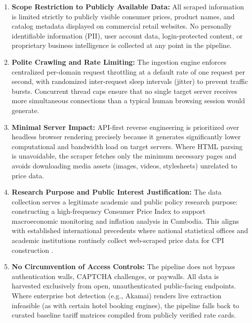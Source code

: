 \begin{enumerate}
    \item \textbf{Scope Restriction to Publicly Available Data:} All scraped information is limited strictly to publicly visible consumer prices, product names, and catalog metadata displayed on commercial retail websites. No personally identifiable information (PII), user account data, login-protected content, or proprietary business intelligence is collected at any point in the pipeline.

    \item \textbf{Polite Crawling and Rate Limiting:} The ingestion engine enforces centralized per-domain request throttling at a default rate of one request per second, with randomized inter-request sleep intervals (jitter) to prevent traffic bursts. Concurrent thread caps ensure that no single target server receives more simultaneous connections than a typical human browsing session would generate.

    \item \textbf{Minimal Server Impact:} API-first reverse engineering is prioritized over headless browser rendering precisely because it generates significantly lower computational and bandwidth load on target servers. Where HTML parsing is unavoidable, the scraper fetches only the minimum necessary pages and avoids downloading media assets (images, videos, stylesheets) unrelated to price data.

    \item \textbf{Research Purpose and Public Interest Justification:} The data collection serves a legitimate academic and public policy research purpose: constructing a high-frequency Consumer Price Index to support macroeconomic monitoring and inflation analysis in Cambodia. This aligns with established international precedents where national statistical offices and academic institutions routinely collect web-scraped price data for CPI construction \citep{cavallo2016billion, aparicio2021targeted}.

    \item \textbf{No Circumvention of Access Controls:} The pipeline does not bypass authentication walls, CAPTCHA challenges, or paywalls. All data is harvested exclusively from open, unauthenticated public-facing endpoints. Where enterprise bot detection (e.g., Akamai) renders live extraction infeasible (as with certain hotel booking engines), the pipeline falls back to curated baseline tariff matrices compiled from publicly verified rate cards.
\end{enumerate}

